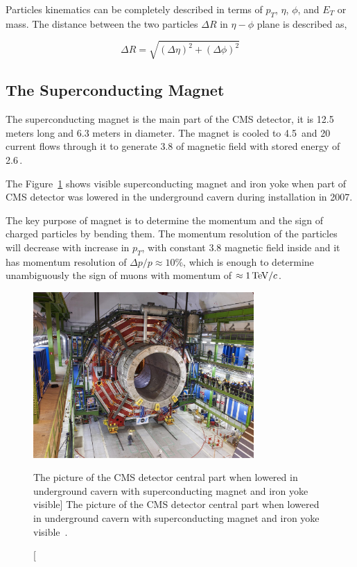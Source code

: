 Particles kinematics can be completely described in terms of
\( p_{T} \), \( \eta \), \( \phi \), and \( E_{T} \) or mass.
The distance between the two particles \( \Delta R \) in \( \eta - \phi \) plane
is described as,

\begin{equation}
  \Delta R = \sqrt{ {(\Delta \eta)}^{2} + {(\Delta \phi)}^{2} }
\end{equation}

\subsection{
  The Superconducting Magnet
}

The superconducting magnet is the main part of the \gls{CMS} detector, it is
12.5 meters long and 6.3 meters in diameter. The magnet is cooled to
4.5\,\xspace and 20\,\xspace current flows through it to
generate 3.8\Tesla{} of magnetic field with stored energy of 2.6\,\xspace.

The Figure~\ref{fig:cms-magnet} shows visible superconducting magnet
and iron yoke when part of \gls{CMS} detector was lowered in the underground
cavern during installation in 2007.

The key purpose of magnet is to determine the momentum and the sign of charged
particles by bending them. The momentum resolution of the particles will
decrease with increase in \(p_T \), with constant 3.8\Tesla{} magnetic field
inside and it has momentum resolution of \(\Delta p /p \approx 10 \% \), which
is enough to determine unambiguously the sign of muons with
momentum of \(\approx 1\,\text{Te\hspace{-.08em}V}{}/c \).

\begin{figure}[!ht]
  \centering
  \includegraphics[width=0.75\textwidth]{figures/cms_magnet_lowered.jpg}
  \caption%
  [The picture of the CMS detector central part when lowered in underground
    cavern with superconducting magnet and iron
    yoke visible]%
  {The picture of the CMS detector central part when lowered in underground
    cavern with superconducting magnet and iron
    yoke visible~\cite{image-cms-magnet}.}%
  \label{fig:cms-magnet}
\end{figure}


